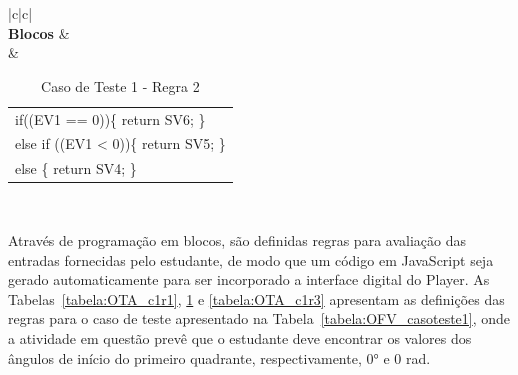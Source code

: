\begin{table}[htb]
	\caption{Caso de Teste 1 - Regra 2}
	\centering
	\begin{tabular}{|c|c|}
		\hline
		 \\ \hline
		\textbf{Blocos} &  \\ \hline
		 &  \begin{tabular}[c]{@{}l@{}}if((EV1 == 0))\{   return SV6; \}\\ else if ((EV1 < 0))\{   return SV5; \}\\ else \{   return SV4; \} \end{tabular}  \\ \hline
	\end{tabular}
	\label{tabela:OTA_c1r2}
\end{table}

Através de programação em blocos, são definidas regras para avaliação das entradas fornecidas pelo estudante, de modo que um código em JavaScript seja gerado automaticamente para ser incorporado a interface digital do Player. As Tabelas~\ref{tabela:OTA_c1r1}, \ref{tabela:OTA_c1r2} e \ref{tabela:OTA_c1r3} apresentam as definições das regras para o caso de teste apresentado na Tabela~\ref{tabela:OFV_casoteste1}, onde a atividade em questão prevê que o estudante deve encontrar os valores dos ângulos de início do primeiro quadrante, respectivamente, 0° e 0 rad.



